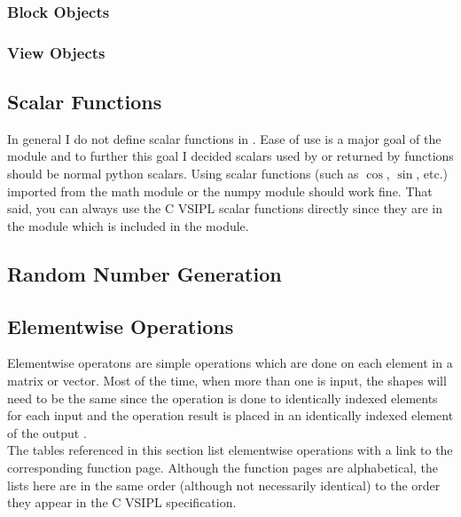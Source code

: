 \subsubsection*{Block Objects}
\subsubsection*{View Objects}
\subsection*{Scalar Functions}
In general I do not define scalar functions in \pyjv.  Ease of use is a major goal of the \pyjv module and to further this goal I decided scalars used by or returned by \pyjv functions should be normal python scalars. Using scalar functions (such as $\cos$, $\sin$, etc.) imported from the math module or the numpy module should work fine. That said, you can always use the C VSIPL scalar functions directly since they are in the  module which is included in the \pyjv module.
\subsection*{Random Number Generation}
\subsection*{Elementwise Operations}
Elementwise operatons are simple operations which are done on each element in a matrix or vector. Most of the time, when more than one  is input, the  shapes will need to be the same since the operation is done to identically indexed elements for each input  and the operation result is placed in an identically indexed element of the output . \\
The tables referenced in this section list elementwise operations with a link to the corresponding function page. Although the function pages are alphabetical, the lists here are in the same order (although not necessarily identical) to the order they appear in the C VSIPL specification.\\
    
    
    
    
    
    
    
    
    
    
